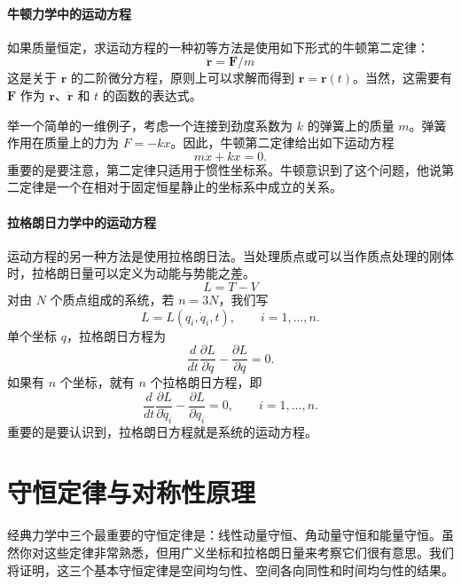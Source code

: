 \paragraph{牛顿力学中的运动方程}
如果质量恒定，求运动方程的一种初等方法是使用如下形式的牛顿第二定律：
\begin{equation}\label{eq:1.newton}
\ddot{\mathbf{r}} = \mathbf{F}/m
\end{equation}
这是关于 $\mathbf{r}$ 的二阶微分方程，原则上可以求解而得到 $\mathbf{r} = \mathbf{r}(t)$。当然，这需要有 $\mathbf{F}$ 作为 $\mathbf{r}$、$\dot{\mathbf{r}}$ 和 $t$ 的函数的表达式。

举一个简单的一维例子，考虑一个连接到劲度系数为 $k$ 的弹簧上的质量 $m$。弹簧作用在质量上的力为 $F = -kx$。因此，牛顿第二定律给出如下运动方程
\begin{equation}\label{eq:1.spring}
m\ddot{x} + kx = 0.
\end{equation}
重要的是要注意，第二定律只适用于惯性坐标系。牛顿意识到了这个问题，他说第二定律是一个在相对于固定恒星静止的坐标系中成立的关系。

\paragraph{拉格朗日力学中的运动方程}
运动方程的另一种方法是使用拉格朗日法。当处理质点或可以当作质点处理的刚体时，拉格朗日量可以定义为动能与势能之差。
\begin{equation}\label{eq:1.LTV}
L = T - V
\end{equation}
对由 $N$ 个质点组成的系统，若 $n = 3N$，我们写
\begin{equation}\label{eq:1.L}
L = L(q_i, \dot{q}_i, t), \qquad i = 1, \ldots, n.
\end{equation}
单个坐标 $q$，拉格朗日方程为
\begin{equation}\label{eq:1.lag}
\frac{d}{dt}\frac{\partial L}{\partial \dot{q}} - \frac{\partial L}{\partial q} = 0.
\end{equation}
如果有 $n$ 个坐标，就有 $n$ 个拉格朗日方程，即
\begin{equation}\label{eq:1.lagN}
\frac{d}{dt}\frac{\partial L}{\partial \dot{q}_i} - \frac{\partial L}{\partial q_i} = 0, \qquad i = 1, \ldots, n.
\end{equation}
重要的是要认识到，拉格朗日方程就是系统的运动方程。

\section{守恒定律与对称性原理}
经典力学中三个最重要的守恒定律是：线性动量守恒、角动量守恒和能量守恒。虽然你对这些定律非常熟悉，但用广义坐标和拉格朗日量来考察它们很有意思。我们将证明，这三个基本守恒定律是空间均匀性、空间各向同性和时间均匀性的结果。

